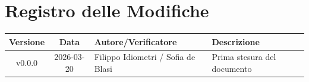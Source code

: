 \section*{Registro delle Modifiche}
\begin{table}[ht]
	\centering
	\renewcommand{\arraystretch}{1.5}
	\begin{tabularx}{\textwidth}{c c l X}
		\toprule
		\textbf{Versione} & \textbf{Data} & \textbf{Autore/Verificatore} & \textbf{Descrizione} \\
		\midrule
		v0.0.0 & 2026-03-20 & {Filippo Idiometri / Sofia de Blasi} & Prima stesura del documento\\
		\bottomrule
	\end{tabularx}
\end{table}